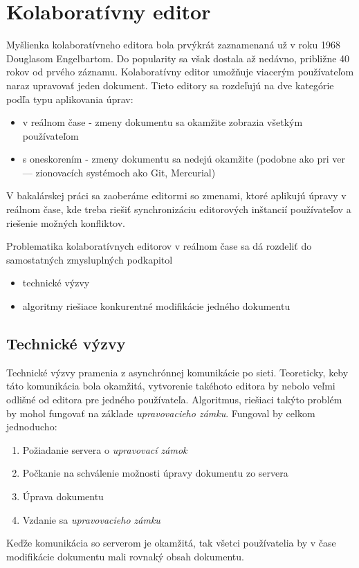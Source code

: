 \chapter{Kolaboratívny editor}

\label{kap:zdialtelnost} %

Myšlienka kolaboratívneho editora bola prvýkrát zaznamenaná už v roku 1968 Douglasom Engelbartom. 
Do popularity sa však dostala až nedávno, približne 40 rokov od prvého záznamu.
Kolaboratívny editor umožňuje viacerým používateľom naraz upravovať jeden dokument.
Tieto editory sa rozdeľujú na dve kategórie podľa typu aplikovania úprav:
\begin{itemize}
  \item v reálnom čase - zmeny dokumentu sa okamžite zobrazia všetkým používateľom
  \item s oneskorením - zmeny dokumentu sa nedejú okamžite (podobne ako pri ver --- zionovacích
  systémoch ako Git, Mercurial)
\end{itemize}
V bakalárskej práci sa zaoberáme editormi so zmenami, ktoré aplikujú úpravy v reálnom čase, kde treba
riešiť synchronizáciu editorových inštancií používateľov a riešenie možných konfliktov.

Problematika kolaboratívnych editorov v reálnom čase sa dá rozdeliť do samostatných zmysluplných 
podkapitol
\begin{itemize}
\item  technické výzvy
\item  algoritmy riešiace konkurentné modifikácie jedného dokumentu
\end{itemize}

\section{Technické výzvy}
Technické výzvy pramenia z asynchrónnej komunikácie po sieti. Teoreticky, keby táto 
komunikácia bola okamžitá, vytvorenie takéhoto editora by nebolo veľmi odlišné od
editora pre jedného používateľa. Algoritmus\label{algo:nesubezne_editovanie}, 
riešiaci takýto problém by mohol fungovať na základe 
\textit{upravovacieho zámku}. Fungoval by celkom jednoducho:
\begin{enumerate}
  \item Požiadanie servera o \textit{upravovací zámok}
  \item Počkanie na schválenie možnosti úpravy dokumentu zo servera
  \item Úprava dokumentu
  \item Vzdanie sa \textit{upravovacieho zámku}
\end{enumerate}
Keďže komunikácia so serverom je okamžitá, tak všetci používatelia by v čase modifikácie
dokumentu mali rovnaký obsah dokumentu. 

